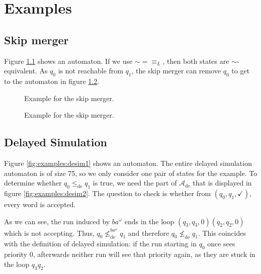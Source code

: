 
\chapter{Examples}

\section{Skip merger}
Figure \ref{fig:examples:skip1} shows an automaton. If we use $\sim = \equiv_L$, then both states are $\sim$-equivalent. As $q_0$ is not reachable from $q_1$, the skip merger can remove $q_0$ to get to the automaton in figure \ref{fig:examples:skip2}.

\begin{figure}
\centering
{}
\caption{Example for the skip merger.}
\label{fig:examples:skip1}
\end{figure}


\begin{figure}
\centering
{}
\caption{Example for the skip merger.}
\label{fig:examples:skip2}
\end{figure}



\section{Delayed Simulation}
Figure \ref{fig:examples:desim1} shows an automaton. The entire delayed simulation automaton is of size 75, so we only consider one pair of states for the example. To determine whether $q_0 \leq_\text{de} q_1$ is true, we need the part of $\mathcal{A}_\text{de}$ that is displayed in figure \ref{fig:examples:desim2}. The question to check is whether from $(q_0, q_1, \checkmark)$, every word is accepted. 

As we can see, the run induced by $ba^\omega$ ends in the loop $(q_3, q_3, 0) (q_2, q_2, 0)$ which is not accepting. Thus, $q_0 \not\leq^{ba^\omega}_\text{de} q_1$ and therefore $q_0 \not\leq_\text{de} q_1$. This coincides with the definition of delayed simulation: if the run starting in $q_0$ once sees priority 0, afterwards neither run will see that priority again, as they are stuck in the loop $q_3 q_2$.

